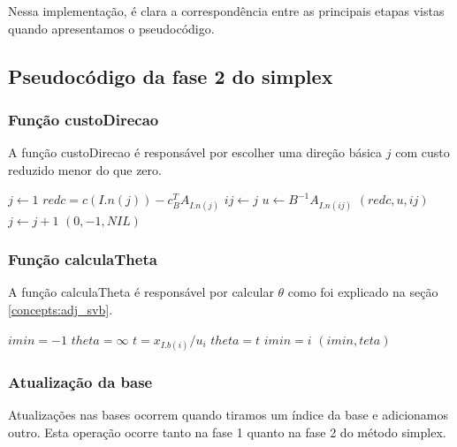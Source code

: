 \documentclass[12pt]{article}
\begin{document}
    Nessa implementação, é clara a correspondência entre as principais etapas vistas quando apresentamos o pseudocódigo.



\subsection{Pseudocódigo da fase 2 do simplex}
\subsubsection{Função custoDirecao}
A função custoDirecao é responsável por escolher uma direção básica $j$ com custo reduzido menor do que zero.
\begin{algorithmic}
	\State $j \gets 1$
		\State $redc = c(I.n(j)) - c^T_BA_{I.n(j)}$
			\State $ij \gets j$
			\State $u \gets B^{-1}A_{I.n(ij)}$
			\Return $(redc, u, ij)$
		\EndIf
		\State $j \gets j + 1$		
	\EndWhile
	\Return $(0, -1, NIL)$
\EndFunction
\end{algorithmic}

\subsubsection{Função calculaTheta}
A função calculaTheta é responsável por calcular $\theta$ como foi explicado na seção \ref{concepts:adj_svb}.
\begin{algorithmic}
	\State $imin = -1$
	\State $theta = \infty$
			\State $t = x_{I.b(i)} / u_i$
				\State $theta = t$
				\State $imin = i$
			\EndIf
		\EndIf
	\EndFor
	\Return $(imin, teta)$
\EndFunction
\end{algorithmic}


\subsubsection{Atualização da base}
Atualizações nas bases ocorrem quando tiramos um índice da base e adicionamos outro. Esta operação ocorre tanto na fase 1 quanto na fase 2 do método simplex.
\end{document}
